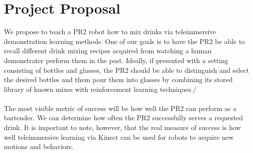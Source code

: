\documentclass{sig-alternate}
\begin{document}
\section{Project Proposal}
\label{sec:project_proposal}We propose to teach a PR2 robot how to mix drinks via
teleimmersive demonstration learning methods. One of our goals is to have the PR2
be able to recall different drink mixing recipes acquired from watching
a human demonstrater perform them in the past. Ideally, if presented
with a setting consisting of bottles and glasses, the PR2 should be able to 
distinguish and select the desired bottles and them pour them into glasses by
combining its stored library of known mixes with reinforcement learning techniques./
\\
\\The most visible metric of success will be  how well the PR2
can perform as a bartender. We can determine how often the PR2
successfully serves a requested drink. It is important to note, however, that the real
measure of success is how well teleimmersive learning via Kinect can be used
for robots to acquire new motions and behaviors.
\end{document}
